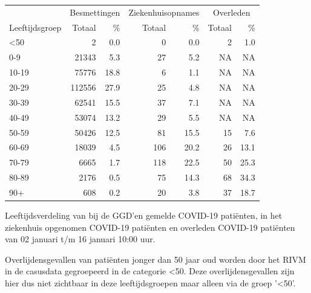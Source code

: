 \documentclass[
  english,
  man,floatsintext]{apa6}
\begin{document}
\begin{table}
\centering\begingroup\fontsize{11}{13}\selectfont

\begin{threeparttable}
\begin{tabular}{lrrrrrr}
\toprule
\multicolumn{1}{c}{ } & \multicolumn{2}{c}{Besmettingen} & \multicolumn{2}{c}{Ziekenhuisopnames} & \multicolumn{2}{c}{Overleden} \\
\cmidrule(l{3pt}r{3pt}){2-3} \cmidrule(l{3pt}r{3pt}){4-5} \cmidrule(l{3pt}r{3pt}){6-7}
Leeftijdsgroep & Totaal & \% & Totaal & \% & Totaal & \%\\
\midrule
<50 & 2 & 0.0 & 0 & 0.0 & 2 & 1.0\\
0-9 & 21343 & 5.3 & 27 & 5.2 & NA & NA\\
10-19 & 75776 & 18.8 & 6 & 1.1 & NA & NA\\
20-29 & 112556 & 27.9 & 25 & 4.8 & NA & NA\\
30-39 & 62541 & 15.5 & 37 & 7.1 & NA & NA\\
40-49 & 53074 & 13.2 & 29 & 5.5 & NA & NA\\
50-59 & 50426 & 12.5 & 81 & 15.5 & 15 & 7.6\\
60-69 & 18039 & 4.5 & 106 & 20.2 & 26 & 13.1\\
70-79 & 6665 & 1.7 & 118 & 22.5 & 50 & 25.3\\
80-89 & 2176 & 0.5 & 75 & 14.3 & 68 & 34.3\\
90+ & 608 & 0.2 & 20 & 3.8 & 37 & 18.7\\
\bottomrule
\end{tabular}
\begin{tablenotes}
\item[1] Leeftijdsverdeling van bij de GGD’en gemelde COVID-19 patiënten, in het ziekenhuis opgenomen COVID-19 patiënten en overleden COVID-19 patiënten van 02 januari t/m 16 januari 10:00 uur.
\item[2] Overlijdensgevallen van patiënten jonger dan 50 jaar oud worden door het RIVM in de casusdata gegroepeerd in de categorie <50. Deze overlijdensgevallen zijn hier dus niet zichtbaar in deze leeftijdsgroepen maar alleen via de groep '<50'.
\end{tablenotes}
\end{threeparttable}
\endgroup{}
\end{table}

\newpage
\end{document}
